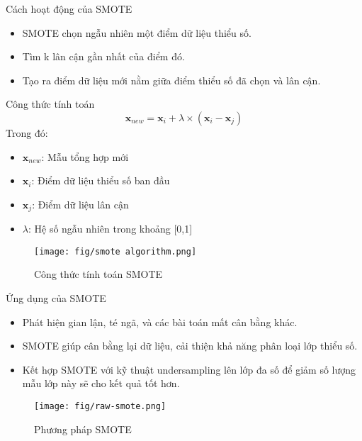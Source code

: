 \documentclass{beamer}
\begin{document}
\begin{frame}{Cách hoạt động của SMOTE}
    \begin{itemize}
        \item SMOTE chọn ngẫu nhiên một điểm dữ liệu thiểu số.
        \item Tìm k lân cận gần nhất của điểm đó.
        \item Tạo ra điểm dữ liệu mới nằm giữa điểm thiểu số đã chọn và lân cận.
    \end{itemize}
\end{frame}

\begin{frame}{Công thức tính toán}
    \begin{equation}
    \mathbf{x}_{new} = \mathbf{x}_i + \lambda \times (\mathbf{x}_i - \mathbf{x}_j)
    \end{equation}
    Trong đó:
    \begin{itemize}
        \item $\mathbf{x}_{new}$: Mẫu tổng hợp mới
        \item $\mathbf{x}_i$: Điểm dữ liệu thiểu số ban đầu
        \item $\mathbf{x}_j$: Điểm dữ liệu lân cận
        \item $\lambda$: Hệ số ngẫu nhiên trong khoảng [0,1]
    \end{itemize}
    \begin{figure}
        \centering
        \texttt{[image: fig/smote algorithm.png]}
        \caption{Công thức tính toán SMOTE}
        \label{fig:lstm}
    \end{figure}
\end{frame}

\begin{frame}{Ứng dụng của SMOTE}
    \begin{itemize}
        \item Phát hiện gian lận, té ngã, và các bài toán mất cân bằng khác.
        \item SMOTE giúp cân bằng lại dữ liệu, cải thiện khả năng phân loại lớp thiểu số.
        \item Kết hợp SMOTE với kỹ thuật undersampling lên lớp đa số để giảm số lượng mẫu lớp này sẽ cho kết quả tốt hơn.
    \end{itemize}
     \begin{figure}
        \centering
        \texttt{[image: fig/raw-smote.png]}
        \caption{Phương pháp SMOTE}
        \label{fig:lstm}
    \end{figure}
\end{frame}
\end{document}
